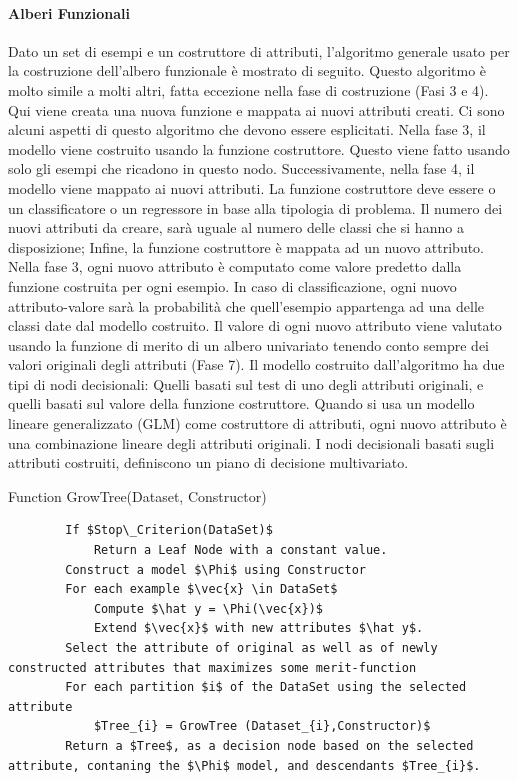 \paragraph{Alberi Funzionali}
Dato un set di esempi e un costruttore di attributi, l'algoritmo generale usato per la costruzione dell'albero funzionale è mostrato di seguito. Questo algoritmo è molto simile a molti altri, fatta eccezione nella fase di costruzione (Fasi 3 e 4). Qui viene creata una nuova funzione e mappata ai nuovi attributi creati. Ci sono alcuni aspetti di questo algoritmo che devono essere esplicitati. Nella fase 3, il modello viene costruito usando la funzione costruttore. Questo viene fatto usando solo gli esempi che ricadono in questo nodo. Successivamente, nella fase 4, il modello viene mappato ai nuovi attributi. La funzione costruttore deve essere o un classificatore o un regressore in base alla tipologia di problema. Il numero dei nuovi attributi da creare, sarà uguale al numero delle classi che si hanno a disposizione; Infine, la funzione costruttore è mappata ad un nuovo attributo. Nella fase 3, ogni nuovo attributo è computato come valore predetto dalla funzione costruita per ogni esempio. In caso di classificazione, ogni nuovo attributo-valore sarà la probabilità che quell'esempio appartenga ad una delle classi date dal modello costruito.
Il valore di ogni nuovo attributo viene valutato usando la funzione di merito di un albero univariato tenendo conto sempre dei valori originali degli attributi (Fase 7). Il modello costruito dall'algoritmo ha due tipi di nodi decisionali: Quelli basati sul test di uno degli attributi originali, e quelli basati sul valore della funzione costruttore. Quando si usa un modello lineare generalizzato (GLM) come costruttore di attributi, ogni nuovo attributo è una combinazione lineare degli attributi originali. I nodi decisionali basati sugli attributi costruiti, definiscono un piano di decisione multivariato.


\lstset{style=customAlg}
\begin{algorithm}
	\caption{Function GrowTree(Dataset, Constructor)}
	\begin{lstlisting}
		If $Stop\_Criterion(DataSet)$
			Return a Leaf Node with a constant value.
		Construct a model $\Phi$ using Constructor
		For each example $\vec{x} \in DataSet$
			Compute $\hat y = \Phi(\vec{x})$
			Extend $\vec{x}$ with new attributes $\hat y$.
		Select the attribute of original as well as of newly constructed attributes that maximizes some merit-function
		For each partition $i$ of the DataSet using the selected attribute
			$Tree_{i} = GrowTree (Dataset_{i},Constructor)$
		Return a $Tree$, as a decision node based on the selected attribute, contaning the $\Phi$ model, and descendants $Tree_{i}$.
	\end{lstlisting}
\end{algorithm}

